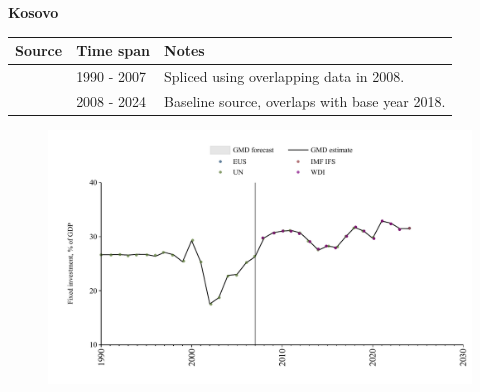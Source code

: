 \documentclass[12pt,a4paper,landscape]{article}
\begin{document}
\begin{adjustbox}{max totalsize={\paperwidth}{\paperheight},center}
\begin{minipage}[t][\textheight][t]{\textwidth}
\vspace*{0.5cm}
{}
\begin{center}
{\Large\bfseries Kosovo}
\end{center}
\vspace{0.5cm}
\begin{table}[H]
\centering
\small
\begin{tabular}{|l|l|l|}
\hline
\textbf{Source} & \textbf{Time span} & \textbf{Notes} \\
\hline
\rowcolor{white}\cite{UN}& 1990 - 2007 &Spliced using overlapping data in 2008.\\
\rowcolor{lightgray}\cite{EUS}& 2008 - 2024 &Baseline source, overlaps with base year 2018.\\
\hline
\end{tabular}
\end{table}
\begin{figure}[H]
\centering
\includegraphics[width=\textwidth,height=0.6\textheight,keepaspectratio]{graphs/XKX_finv_GDP.pdf}
\end{figure}
\end{minipage}
\end{adjustbox}
\end{document}
